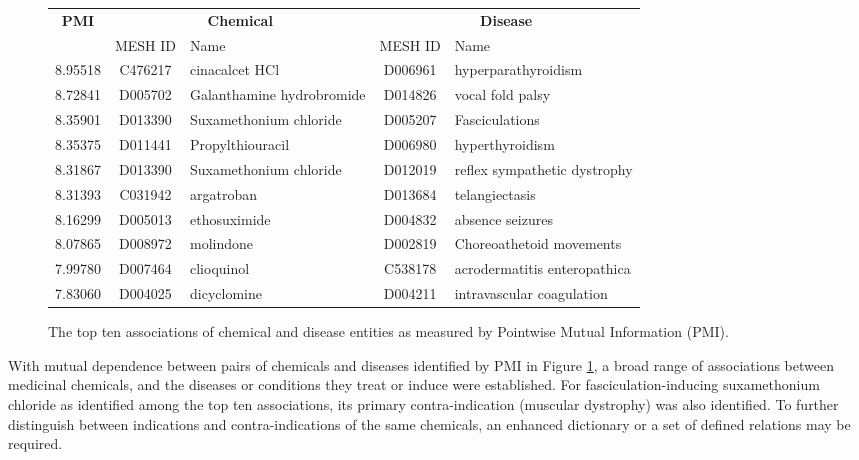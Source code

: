 \documentclass[10pt, oneside]{article}
\begin{document}
\begin{figure}[h]
\begin{center}
\fontsize{9}{11}\selectfont
\begin{tabular}{|*{2}{c|}p{4.5cm}|c|p{4.5cm}|}\hline
 \multirow{2}{*}{\textbf{PMI}} & \multicolumn{2}{c|}{\textbf{Chemical}} & \multicolumn{2}{c|}{\textbf{Disease}} \\ \cline{2-5}
 & MESH ID   & Name                      & MESH ID   & Name                         \\ \hline
 8.95518 & C476217   & cinacalcet HCl            & D006961   & hyperparathyroidism          \\ \hline
 8.72841 & D005702   & Galanthamine hydrobromide & D014826   & vocal fold palsy             \\ \hline
 8.35901 & D013390   & Suxamethonium chloride    & D005207   & Fasciculations               \\ \hline
 8.35375 & D011441   & Propylthiouracil          & D006980   & hyperthyroidism              \\ \hline
 8.31867 & D013390   & Suxamethonium chloride    & D012019   & reflex sympathetic dystrophy \\ \hline
 8.31393 & C031942   & argatroban                & D013684   & telangiectasis               \\ \hline
 8.16299 & D005013   & ethosuximide              & D004832   & absence seizures             \\ \hline
 8.07865 & D008972   & molindone                 & D002819   & Choreoathetoid movements     \\ \hline
 7.99780 & D007464   & clioquinol                & C538178   & acrodermatitis enteropathica \\ \hline
 7.83060 & D004025   & dicyclomine               & D004211   & intravascular coagulation    \\ \hline
\end{tabular}
\caption{\label{fig:pmi} The top ten associations of chemical and disease entities as measured by Pointwise Mutual Information (PMI).}
\end{center}
\end{figure}

With mutual dependence between pairs of chemicals and diseases identified by PMI in Figure \ref{fig:pmi}, a broad range of associations between medicinal chemicals, and the diseases or conditions they treat or induce were established. For fasciculation-inducing suxamethonium chloride as identified among the top ten associations, its primary contra-indication (muscular dystrophy) \cite{suxamethonium} was also identified. To further distinguish between indications and contra-indications of the same chemicals, an enhanced dictionary or a set of defined relations \cite{kim2005biocontrasts} may be required.
\end{document}
